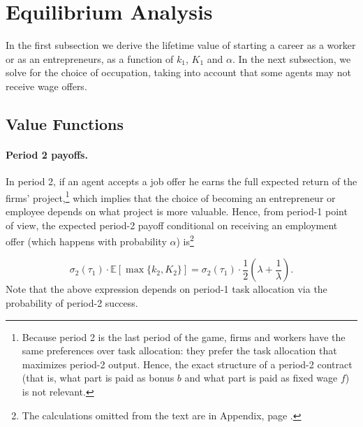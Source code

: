 \documentclass[12pt,american]{paper}
\theoremstyle{remark}
\begin{document}
\section{Equilibrium Analysis}\label{sec:equilibrium}
In the first subsection we derive the lifetime value of starting a career as a worker or as an entrepreneurs, as a function of $k_1$, $K_1$ and $\alpha$.  In the next subsection, we solve for the choice of occupation, taking into account that some agents may not receive wage offers.

\subsection{Value Functions}

\paragraph{Period 2 payoffs.} 
In period 2, if an agent accepts a job offer he earns the full expected return of the firms' project,\footnote{%
Because period 2 is the last period of the game, firms and workers have the same preferences over task allocation: they prefer the task allocation that maximizes period-2 output. Hence, the exact structure of a period-2 contract (that is, what part is paid as bonus $b$ and what part is paid as fixed wage $f$) is not relevant. } which implies that the choice of becoming an entrepreneur or employee depends on what project is more valuable. Hence, from period-1 point of view, the expected period-2 payoff conditional on receiving an employment offer (which happens with probability $\alpha$) is\footnote{The calculations omitted from the text are in Appendix, page \pageref{omitted calculations}. }


\[
\sigma_2(\tau_1) \cdot \mathbb E[\max\{k_2,K_2\}]=\sigma_2(\tau_1) \cdot \frac{1}{2} \left( \lambda + \frac{1}{\lambda} \right).
\]
Note that the above expression depends on period-1 task allocation via the probability of period-2 success.
\end{document}
